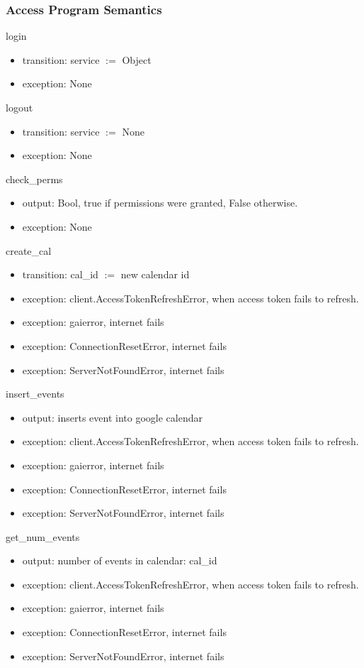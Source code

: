 \documentclass[12pt, titlepage]{article}
\begin{document}
\subsubsection{Access Program Semantics}
login 
\begin{itemize}
    \item transition: service $:=$ Object
    \item exception: None
\end{itemize}
logout
\begin{itemize}
    \item transition: service $:=$ None
    \item exception: None
\end{itemize}
check\_perms
\begin{itemize}
    \item output: Bool, true if permissions were granted, False otherwise.
    \item exception: None
\end{itemize}
create\_cal
\begin{itemize}
    \item transition: cal\_id $:=$ new calendar id
    \item exception: client.AccessTokenRefreshError, when access token fails to refresh.
    \item exception: gaierror, internet fails
    \item exception: ConnectionResetError, internet fails
    \item exception: ServerNotFoundError, internet fails
\end{itemize}
insert\_events
\begin{itemize}
    \item output: inserts event into google calendar
    \item exception: client.AccessTokenRefreshError, when access token fails to refresh.
    \item exception: gaierror, internet fails
    \item exception: ConnectionResetError, internet fails
    \item exception: ServerNotFoundError, internet fails
\end{itemize}
get\_num\_events
\begin{itemize}
    \item output: number of events in calendar: cal\_id
    \item exception: client.AccessTokenRefreshError, when access token fails to refresh.
    \item exception: gaierror, internet fails
    \item exception: ConnectionResetError, internet fails
    \item exception: ServerNotFoundError, internet fails
\end{itemize}
\end{document}
